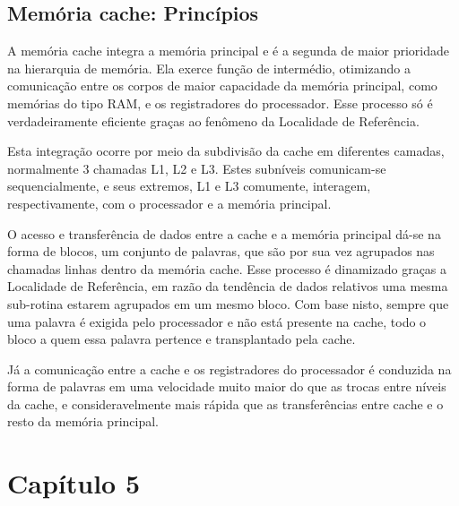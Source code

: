 \documentclass[12pt]{elsarticle}
\begin{document}
\subsection{Memória cache: Princípios}
A memória cache integra a memória principal e é a segunda de maior prioridade na hierarquia de memória. Ela exerce função de intermédio, otimizando a comunicação entre os corpos de maior capacidade da memória principal, como memórias do tipo RAM, e os registradores do processador. Esse processo só é verdadeiramente eficiente graças ao fenômeno da Localidade de Referência. 

Esta integração ocorre por meio da subdivisão da cache em diferentes camadas, normalmente 3 chamadas L1, L2 e L3. Estes subníveis comunicam-se sequencialmente, e seus extremos, L1 e L3 comumente, interagem, respectivamente, com o processador e a memória principal. 

O acesso e transferência de dados entre a cache e a memória principal dá-se na forma de blocos, um conjunto de palavras, que são por sua vez agrupados nas chamadas linhas dentro da memória cache. Esse processo é dinamizado graças a Localidade de Referência, em razão da tendência de dados relativos uma mesma sub-rotina estarem agrupados em um mesmo bloco. Com base nisto, sempre que uma palavra é exigida pelo processador e não está presente na cache, todo o bloco a quem essa palavra pertence e transplantado pela cache. 

Já a comunicação entre a cache e os registradores do processador é conduzida na forma de palavras em uma velocidade muito maior do que as trocas entre níveis da cache, e consideravelmente mais rápida que as transferências entre cache e o resto da memória principal.
\subsection{}
\section{Capítulo 5}



 
\end{document}
